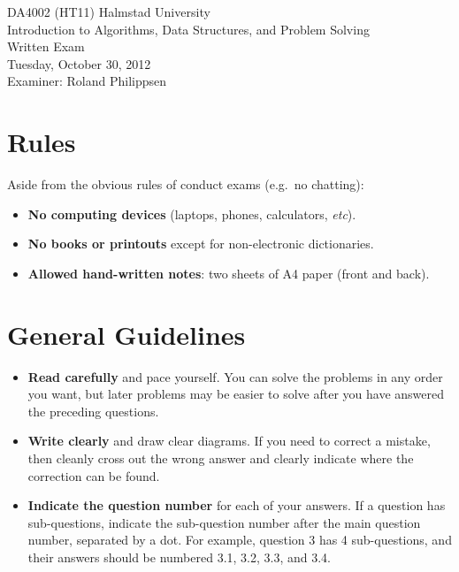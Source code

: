 \documentclass[a4paper]{article}
\newcounter{question}
\begin{document}
\pagestyle{empty}
\thispagestyle{empty}



\noindent
\begin{minipage}{\columnwidth}
  \centering
  \Large
  DA4002 (HT11) Halmstad University\\
  Introduction to Algorithms, Data Structures, and Problem Solving\\[3\baselineskip]
  \Huge
  Written Exam\\
  \Large
  Tuesday, October 30, 2012\\[2\baselineskip]
  Examiner: Roland Philippsen
\end{minipage}

\vfill

\noindent
\begin{center}
\end{center}

\vfill



\section*{Rules}

Aside from the obvious rules of conduct exams (e.g.\ no chatting):

\begin{itemize}
\item
  \textbf{No computing devices} (laptops, phones, calculators, \emph{etc}).
\item
  \textbf{No books or printouts} except for non-electronic dictionaries.
\item
  \textbf{Allowed hand-written notes}: two sheets of A4 paper (front and back).
\end{itemize}



\section*{General Guidelines}

\begin{itemize}
\item
  \textbf{Read carefully} and pace yourself.
  You can solve the problems in any order you want, but later problems may be easier to solve after you have answered the preceding questions.
\item
  \textbf{Write clearly} and draw clear diagrams.
  If you need to correct a mistake, then cleanly cross out the wrong answer and clearly indicate where the correction can be found.
\item
  \textbf{Indicate the question number} for each of your answers.
  If a question has sub-questions, indicate the sub-question number after the main question number, separated by a dot.
  For example, question 3 has 4 sub-questions, and their answers should be numbered 3.1, 3.2, 3.3, and 3.4.
\end{itemize}
\end{document}
